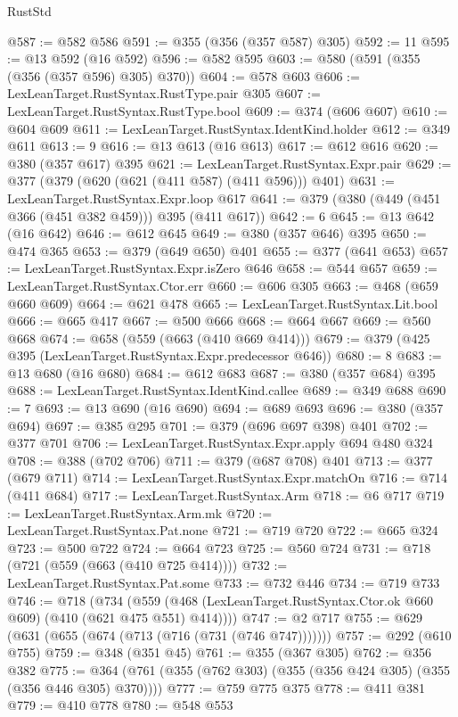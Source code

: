 \begin{lexlean}{RustStd}
\begin{coremodule}
{\begin{coremodule}
{{{{{{{{@587 := @582 @586
@591 := @355 (@356 (@357 @587) @305)
@592 := 11
@595 := @13 @592 (@16 @592)
@596 := @582 @595
@603 := @580 (@591 (@355 (@356 (@357 @596) @305) @370))
@604 := @578 @603
@606 := LexLeanTarget.RustSyntax.RustType.pair @305
@607 := LexLeanTarget.RustSyntax.RustType.bool
@609 := @374 (@606 @607)
@610 := @604 @609
@611 := LexLeanTarget.RustSyntax.IdentKind.holder
@612 := @349 @611
@613 := 9
@616 := @13 @613 (@16 @613)
@617 := @612 @616
@620 := @380 (@357 @617) @395
@621 := LexLeanTarget.RustSyntax.Expr.pair
@629 := @377 (@379 (@620 (@621 (@411 @587) (@411 @596))) @401)
@631 := LexLeanTarget.RustSyntax.Expr.loop @617
@641 := @379 (@380 (@449 (@451 @366 (@451 @382 @459))) @395 (@411 @617))
@642 := 6
@645 := @13 @642 (@16 @642)
@646 := @612 @645
@649 := @380 (@357 @646) @395
@650 := @474 @365
@653 := @379 (@649 @650) @401
@655 := @377 (@641 @653)
@657 := LexLeanTarget.RustSyntax.Expr.isZero @646
@658 := @544 @657
@659 := LexLeanTarget.RustSyntax.Ctor.err
@660 := @606 @305
@663 := @468 (@659 @660 @609)
@664 := @621 @478
@665 := LexLeanTarget.RustSyntax.Lit.bool
@666 := @665 @417
@667 := @500 @666
@668 := @664 @667
@669 := @560 @668
@674 := @658 (@559 (@663 (@410 @669 @414)))
@679 := @379 (@425 @395 (LexLeanTarget.RustSyntax.Expr.predecessor @646))
@680 := 8
@683 := @13 @680 (@16 @680)
@684 := @612 @683
@687 := @380 (@357 @684) @395
@688 := LexLeanTarget.RustSyntax.IdentKind.callee
@689 := @349 @688
@690 := 7
@693 := @13 @690 (@16 @690)
@694 := @689 @693
@696 := @380 (@357 @694)
@697 := @385 @295
@701 := @379 (@696 @697 @398) @401
@702 := @377 @701
@706 := LexLeanTarget.RustSyntax.Expr.apply @694 @480 @324
@708 := @388 (@702 @706)
@711 := @379 (@687 @708) @401
@713 := @377 (@679 @711)
@714 := LexLeanTarget.RustSyntax.Expr.matchOn
@716 := @714 (@411 @684)
@717 := LexLeanTarget.RustSyntax.Arm
@718 := @6 @717
@719 := LexLeanTarget.RustSyntax.Arm.mk
@720 := LexLeanTarget.RustSyntax.Pat.none
@721 := @719 @720
@722 := @665 @324
@723 := @500 @722
@724 := @664 @723
@725 := @560 @724
@731 := @718 (@721 (@559 (@663 (@410 @725 @414))))
@732 := LexLeanTarget.RustSyntax.Pat.some
@733 := @732 @446
@734 := @719 @733
@746 := @718
    (@734 (@559 (@468 (LexLeanTarget.RustSyntax.Ctor.ok @660 @609) (@410 (@621 @475 @551) @414))))
@747 := @2 @717
@755 := @629 (@631 (@655 (@674 (@713 (@716 (@731 (@746 @747)))))))
@757 := @292 (@610 @755)
@759 := @348 (@351 @45)
@761 := @355 (@367 @305)
@762 := @356 @382
@775 := @364 (@761 (@355 (@762 @303) (@355 (@356 @424 @305) (@355 (@356 @446 @305) @370))))
@777 := @759 @775 @375
@778 := @411 @381
@779 := @410 @778
@780 := @548 @553
}}}}}}}}
\end{coremodule}}
\end{coremodule}
\end{lexlean}
